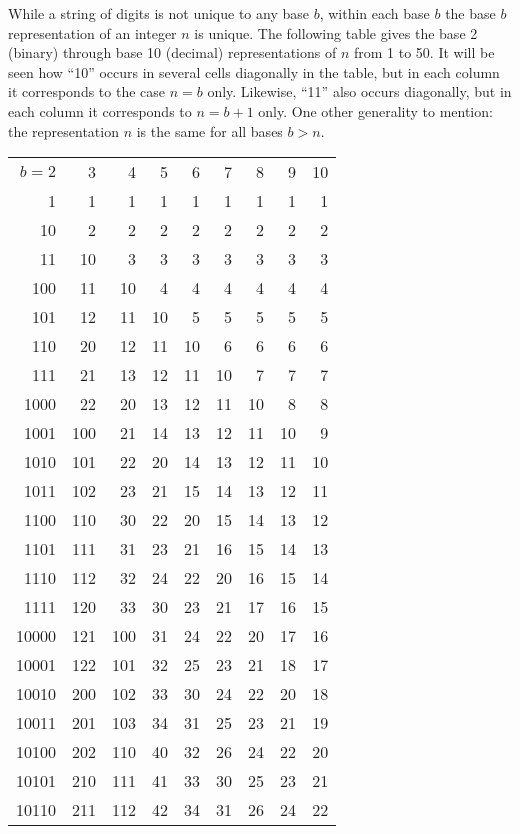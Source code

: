 \documentclass[12pt]{article}
\begin{document}
While a string of digits is not unique to any base $b$, within each base $b$ the base $b$ representation of an integer $n$ is unique. The following table gives the base 2 (binary) through base 10 (decimal) representations of $n$ from 1 to 50. It will be seen how ``10'' occurs in several cells diagonally in the table, but in each column it corresponds to the case $n = b$ only. Likewise, ``11'' also occurs diagonally, but in each column it corresponds to $n = b + 1$ only. One other generality to mention: the representation $n$ is the same for all bases $b > n$.

\begin{tabular}{|r|r|r|r|r|r|r|r|r|}
$b = 2$ & 3 & 4 & 5 & 6 & 7 & 8 & 9 & 10 \\
1 & 1 & 1 & 1 & 1 & 1 & 1 & 1 & 1 \\
10 & 2 & 2 & 2 & 2 & 2 & 2 & 2 & 2 \\
11 & 10 & 3 & 3 & 3 & 3 & 3 & 3 & 3 \\
100 & 11 & 10 & 4 & 4 & 4 & 4 & 4 & 4 \\
101 & 12 & 11 & 10 & 5 & 5 & 5 & 5 & 5 \\
110 & 20 & 12 & 11 & 10 & 6 & 6 & 6 & 6 \\
111 & 21 & 13 & 12 & 11 & 10 & 7 & 7 & 7 \\
1000 & 22 & 20 & 13 & 12 & 11 & 10 & 8 & 8 \\
1001 & 100 & 21 & 14 & 13 & 12 & 11 & 10 & 9 \\
1010 & 101 & 22 & 20 & 14 & 13 & 12 & 11 & 10 \\
1011 & 102 & 23 & 21 & 15 & 14 & 13 & 12 & 11 \\
1100 & 110 & 30 & 22 & 20 & 15 & 14 & 13 & 12 \\
1101 & 111 & 31 & 23 & 21 & 16 & 15 & 14 & 13 \\
1110 & 112 & 32 & 24 & 22 & 20 & 16 & 15 & 14 \\
1111 & 120 & 33 & 30 & 23 & 21 & 17 & 16 & 15 \\
10000 & 121 & 100 & 31 & 24 & 22 & 20 & 17 & 16 \\
10001 & 122 & 101 & 32 & 25 & 23 & 21 & 18 & 17 \\
10010 & 200 & 102 & 33 & 30 & 24 & 22 & 20 & 18 \\
10011 & 201 & 103 & 34 & 31 & 25 & 23 & 21 & 19 \\
10100 & 202 & 110 & 40 & 32 & 26 & 24 & 22 & 20 \\
10101 & 210 & 111 & 41 & 33 & 30 & 25 & 23 & 21 \\
10110 & 211 & 112 & 42 & 34 & 31 & 26 & 24 & 22 \\

\end{tabular}
\end{document}

